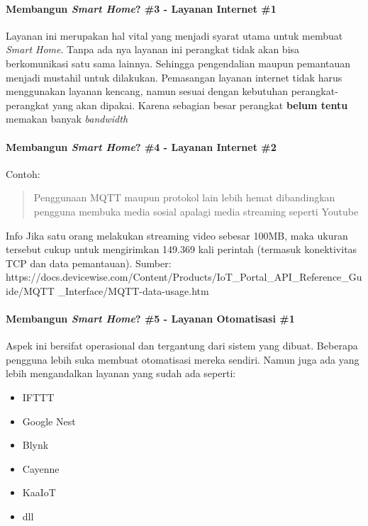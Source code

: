\begin{frame}{\insertsectionhead}
	\framesubtitle{Membangun \textit{Smart Home}? \#3 - Layanan Internet \#1}
	\justifying
	Layanan ini merupakan hal vital yang menjadi syarat utama untuk membuat \textit{Smart Home}. Tanpa ada nya layanan ini perangkat tidak akan bisa berkomunikasi satu sama lainnya. Sehingga pengendalian maupun pemantauan menjadi mustahil untuk dilakukan.
	\vfill
	Pemasangan layanan internet tidak harus menggunakan layanan kencang, namun sesuai dengan kebutuhan perangkat-perangkat yang akan dipakai. Karena sebagian besar perangkat \textbf{belum tentu} memakan banyak \textit{bandwidth}
\end{frame}

\begin{frame}{\insertsectionhead}
	\framesubtitle{Membangun \textit{Smart Home}? \#4 - Layanan Internet \#2}
	\justifying
	Contoh:
	\vfill
	\begin{quote}
		Penggunaan MQTT maupun protokol lain lebih hemat dibandingkan pengguna membuka media sosial apalagi media streaming seperti Youtube
	\end{quote}
	\vfill
	\begin{block}{Info}
		Jika satu orang melakukan streaming video sebesar 100MB, maka ukuran tersebut cukup untuk mengirimkan  149.369 kali perintah (termasuk konektivitas TCP dan data pemantauan).  Sumber: https://docs.devicewise.com/Content/Products/IoT\_Portal\_API\_Reference\_Guide/MQTT
		\_Interface/MQTT-data-usage.htm
	\end{block}
\end{frame}

\begin{frame}{\insertsectionhead}
	\framesubtitle{Membangun \textit{Smart Home}? \#5 - Layanan Otomatisasi \#1}
	\justifying
	Aspek ini bersifat operasional dan tergantung dari sistem yang dibuat. Beberapa pengguna lebih suka membuat otomatisasi mereka sendiri. Namun juga ada yang lebih mengandalkan layanan yang sudah ada seperti:
	\vfill
	\begin{itemize}
		\item IFTTT
		\item Google Nest
		\item Blynk
		\item Cayenne
		\item KaaIoT
		\item dll
	\end{itemize}
\end{frame}

